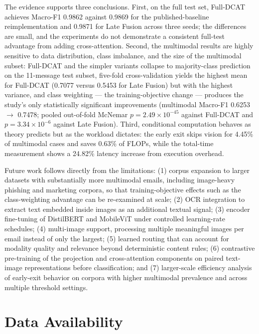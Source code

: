\documentclass[10pt,twoside]{article}
\begin{document}
The evidence supports three conclusions. First, on the full test set, Full-DCAT achieves Macro-F1 0.9862 against 0.9869 for the published-baseline reimplementation and 0.9871 for Late Fusion across three seeds; the differences are small, and the experiments do not demonstrate a consistent full-test advantage from adding cross-attention. Second, the multimodal results are highly sensitive to data distribution, class imbalance, and the size of the multimodal subset: Full-DCAT and the simpler variants collapse to majority-class prediction on the 11-message test subset, five-fold cross-validation yields the highest mean for Full-DCAT (0.7077 versus 0.5453 for Late Fusion) but with the highest variance, and class weighting --- the training-objective change --- produces the study's only statistically significant improvements (multimodal Macro-F1 0.6253 $\rightarrow$ 0.7478; pooled out-of-fold McNemar $p = 2.49 \times 10^{-45}$ against Full-DCAT and $p = 3.34 \times 10^{-6}$ against Late Fusion). Third, conditional computation behaves as theory predicts but as the workload dictates: the early exit skips vision for 4.45\% of multimodal cases and saves 0.63\% of FLOPs, while the total-time measurement shows a 24.82\% latency increase from execution overhead.

Future work follows directly from the limitations: (1) corpus expansion to larger datasets with substantially more multimodal emails, including image-heavy phishing and marketing corpora, so that training-objective effects such as the class-weighting advantage can be re-examined at scale; (2) OCR integration to extract text embedded inside images as an additional textual signal; (3) encoder fine-tuning of DistilBERT and MobileViT under controlled learning-rate schedules; (4) multi-image support, processing multiple meaningful images per email instead of only the largest; (5) learned routing that can account for modality quality and relevance beyond deterministic content rules; (6) contrastive pre-training of the projection and cross-attention components on paired text-image representations before classification; and (7) larger-scale efficiency analysis of early-exit behavior on corpora with higher multimodal prevalence and across multiple threshold settings.

\section*{Data Availability}
\end{document}
